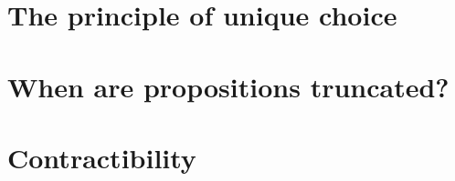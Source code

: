 \section{The principle of unique choice}
\label{sec:unique-choice}


\section{When are propositions truncated?}
\label{subsec:when-trunc}


\section{Contractibility}
\label{sec:contractibility}


\sectionNotes


\sectionExercises

